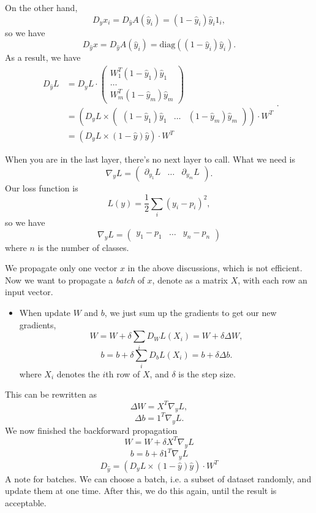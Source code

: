 On the other hand,
\[
D_{\hat y}x_i=D_{\hat y}A({\hat y}_i)=(1-{\hat y}_i){\hat y}_i1_i,
\]
so we have
\[
D_{\hat y}x=D_{\hat y}A({\hat y}_i)=\text{diag}{((1-{\hat y}_i){\hat y}_i)}.
\]
As a result, we have
\[
\begin{split}
D_{\hat y}L&=D_yL\cdot
\begin{pmatrix}
W_1^T(1-{\hat y}_1){\hat y}_1 \\ \dots\\ W_m^T(1-{\hat y}_m){\hat y}_m
\end{pmatrix}\\
&=(D_yL\times
\begin{pmatrix}
(1-{\hat y}_1){\hat y}_1 & \dots & (1-{\hat y}_m){\hat y}_m
\end{pmatrix})
\cdot W^T\\
&=(D_yL\times(1-{\hat y}){\hat y})\cdot W^T
\end{split}.
\]



When you are in the last layer, there's no next layer to call. What we need is
\[
\nabla_yL=
\begin{pmatrix}
\partial_{y_1}L & \dots &\partial_{y_m}L
\end{pmatrix}.
\]
Our loss function is
\[
L(y)=\frac{1}{2}\sum_i{(y_i-p_i)}^2,
\]
so we have
\[
\nabla_yL=
\begin{pmatrix}
y_1-p_1 & \dots & y_n-p_n
\end{pmatrix}
\]
where $n$ is the number of classes.

We propagate only one vector $x$ in the above discussions, which is not efficient. Now we want to propagate a \emph{batch} of $x$, denote as a matrix $X$, with each row an input vector.
\begin{itemize}
    \item When update $W$ and $b$, we just sum up the gradients to get our new gradients,
\[W = W + \delta\sum_i D_WL(X_i)=W+\delta\Delta W,\]
\[b = b+\delta\sum_i D_bL(X_i)=b+\delta\Delta b.\]
where $X_i$ denotes the $i$th row of $X$, and $\delta$ is the step size.
\end{itemize}

This can be rewritten as
\[
\Delta W=X^T\nabla_yL,
\]
\[
\Delta b=1^T\nabla_yL.
\]
We now finished the backforward propagation
\[
W=W+\delta X^T\nabla_yL
\]
\[
b=b+\delta 1^T\nabla_yL
\]
\[
D_{\hat y}=(D_yL\times(1-{\hat y}){\hat y})\cdot W^T
\]
A note for batches. We can choose a batch, i.e. a subset of dataset randomly, and update them at one time. After this, we do this again, until the result is acceptable.


